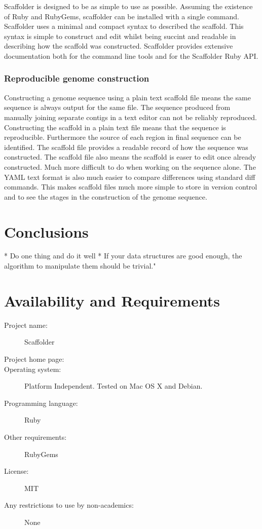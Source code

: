 \documentclass[10pt]{bmc_article}
\newenvironment{bmcformat}{\begin{raggedright}\baselineskip20pt\sloppy\setboolean{publ}{false}}{\end{raggedright}\baselineskip20pt\sloppy}
\begin{document}
\begin{bmcformat}
Scaffolder is designed to be as simple to use as possible. Assuming the
existence of Ruby and RubyGems, scaffolder can be installed with a single
command. Scaffolder uses a minimal and compact syntax to described the
scaffold. This syntax is simple to construct and edit whilst being succint and
readable in describing how the scaffold was constructed. Scaffolder provides
extensive documentation both for the command line tools and for the Scaffolder
Ruby API.

\subsubsection{Reproducible genome construction}

Constructing a genome sequence using a plain text scaffold file means the same
sequence is always output for the same file. The sequence produced from
manually joining separate contigs in a text editor can not be reliably
reproduced. Constructing the scaffold in a plain text file means that the
sequence is reproducible. Furthermore the source of each region in final
sequence can be identified. The scaffold file provides a readable record of
how the sequence was constructed. The scaffold file also means the scaffold is
easer to edit once already constructed. Much more difficult to do when working
on the sequence alone. The YAML text format is also much easier to compare
differences using standard diff commands. This makes scaffold files much more
simple to store in version control and to see the stages in the construction
of the genome sequence.

\section*{Conclusions} %

  * Do one thing and do it well
  * If your data structures are good enough, the algorithm to manipulate them should be trivial."

\section*{Availability and Requirements} %

  \begin{description}
    \item[Project name:] Scaffolder
    \item[Project home page:] \scaffolder
    \item[Operating system:] Platform Independent. Tested on Mac OS X and
    Debian.
    \item[Programming language:] Ruby
    \item[Other requirements:] RubyGems
    \item[License:] MIT
    \item[Any restrictions to use by non-academics:] None
  \end{description}


\end{bmcformat}
\end{document}
